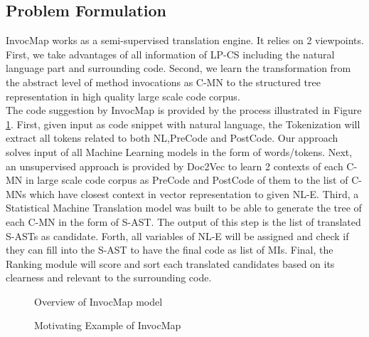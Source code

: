 \documentclass[sigconf,review,anonymous]{article}
\begin{document}
\subsection{Problem Formulation}
InvocMap works as a semi-supervised translation engine. It relies on 2 viewpoints. First, we take advantages of all information of LP-CS including the natural language part and surrounding code. Second, we learn the transformation from the abstract level of method invocations as C-MN to the structured tree representation in high quality large scale code corpus. 
\\
The code suggestion by InvocMap is provided by the process illustrated in Figure \ref{figOverview}. First, given input as code snippet with natural language, the Tokenization will extract all tokens related to both NL,PreCode and PostCode. Our approach solves input of all Machine Learning models in the form of words/tokens. Next, an unsupervised approach is provided by Doc2Vec \cite{002} to learn 2 contexts of each C-MN in large scale code corpus as PreCode and PostCode of them to the list of C-MNs which have closest context in vector representation to given NL-E. Third, a Statistical Machine Translation model was built to be able to generate the tree of each C-MN in the form of S-AST. The output of this step is the list of translated S-ASTs as candidate. Forth, all variables of NL-E will be assigned and check if they can fill into the S-AST to have the final code as list of MIs. Final, the Ranking module will score and sort each translated candidates based on its clearness and relevant to the surrounding code.  
\begin{figure}
   
        \caption{Overview of InvocMap model}
        \label{figOverview} 
\end{figure}
\begin{figure}
        \caption{Motivating Example of InvocMap}
        \label{figMotivatingExample} 
\end{figure}
\end{document}
